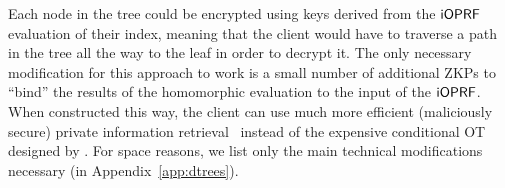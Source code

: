 Each node in the tree could be encrypted using keys derived
from the $\mathsf{i}\mathsf{OPRF}$ evaluation of their index, meaning that the client
would have to traverse a path in the tree all the way to the leaf in
order to decrypt it.  The only necessary modification for this
approach to work is a small number of additional ZKPs to ``bind'' the
results of the homomorphic evaluation to the input of the $\mathsf{i}\mathsf{OPRF}$.
When constructed this way, the client can use much more efficient
(maliciously secure) private information
retrieval~\cite{chang2004single} instead of the expensive conditional
OT designed by \citet{wu2016privately}.  For space reasons, we list only the main technical modifications necessary (in Appendix~\ref{app:dtrees}).
